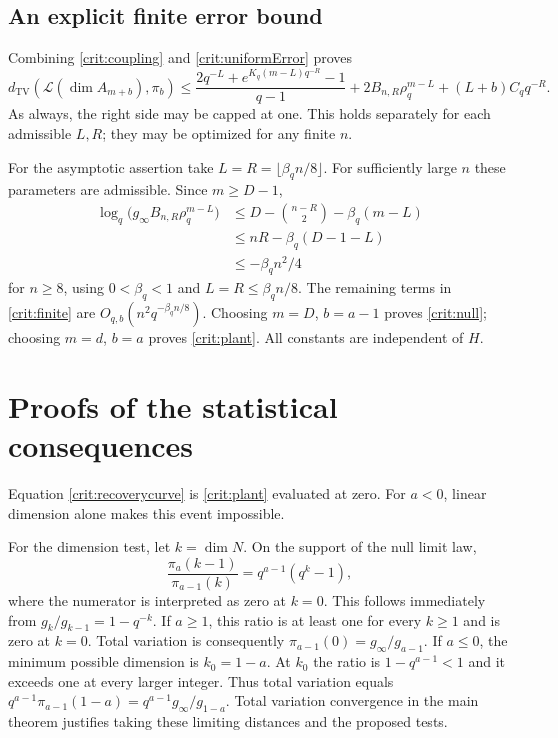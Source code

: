 \subsection{An explicit finite error bound}

Combining \eqref{crit:coupling} and \eqref{crit:uniformError} proves
\begin{equation}\label{crit:finite}
 d_{\mathrm{TV}}\!\left(\mathcal L(\dim A_{m+b}),\pi_b\right)
 \le
 \frac{2q^{-L}+e^{K_q(m-L)q^{-R}}-1}{q-1}
 +2B_{n,R}\rho_q^{m-L}+(L+b)C_qq^{-R}.
\end{equation}
As always, the right side may be capped at one. This holds separately
for each admissible $L,R$; they may be optimized for any finite $n$.

For the asymptotic assertion take
$L=R=\lfloor\beta_q n/8\rfloor$. For sufficiently large $n$ these
parameters are admissible. Since $m\ge D-1$,
\begin{align*}
 \log_q\bigl(g_\infty B_{n,R}\rho_q^{m-L}\bigr)
 &\le D-\binom{n-R}{2}-\beta_q(m-L)\\
 &\le nR-\beta_q(D-1-L)\\
 &\le-\beta_q n^2/4
\end{align*}
for $n\ge8$, using $0<\beta_q<1$ and $L=R\le\beta_q n/8$.
The remaining terms in \eqref{crit:finite} are
$O_{q,b}(n^2q^{-\beta_q n/8})$. Choosing $m=D$, $b=a-1$ proves
\eqref{crit:null}; choosing $m=d$, $b=a$ proves
\eqref{crit:plant}. All constants are independent of $H$.

\section{Proofs of the statistical consequences}

Equation \eqref{crit:recoverycurve} is \eqref{crit:plant} evaluated at
zero. For $a<0$, linear dimension alone makes this event impossible.

For the dimension test, let $k=\dim N$. On the support of the null
limit law,
\begin{equation}\label{crit:dimensionLikelihood}
 \frac{\pi_a(k-1)}{\pi_{a-1}(k)}
 =q^{a-1}(q^k-1),
\end{equation}
where the numerator is interpreted as zero at $k=0$. This follows
immediately from $g_k/g_{k-1}=1-q^{-k}$.
If $a\ge1$, this ratio is at least one for every $k\ge1$ and is
zero at $k=0$. Total variation is consequently
$\pi_{a-1}(0)=g_\infty/g_{a-1}$.
If $a\le0$, the minimum possible dimension is $k_0=1-a$.
At $k_0$ the ratio is $1-q^{a-1}<1$ and it exceeds one at every
larger integer. Thus total variation equals
$q^{a-1}\pi_{a-1}(1-a)=q^{a-1}g_\infty/g_{1-a}$.
Total variation convergence in the main theorem justifies taking
these limiting distances and the proposed tests.

